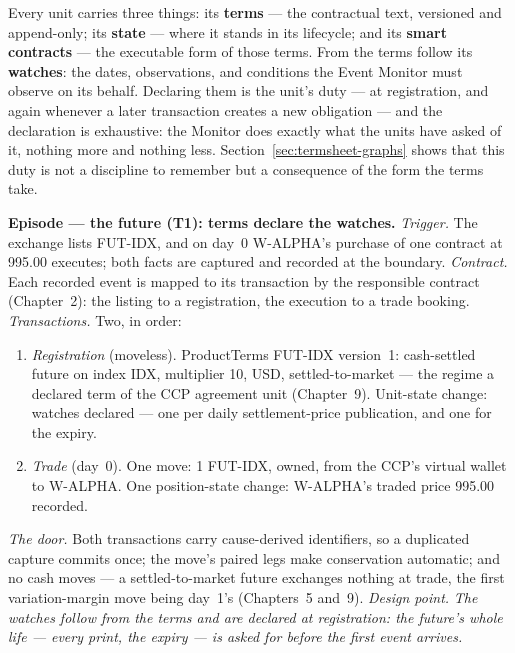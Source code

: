 Every unit carries three things: its \textbf{terms} --- the contractual text, versioned
and append-only; its \textbf{state} --- where it stands in its lifecycle; and its
\textbf{smart contracts} --- the executable form of those terms. From the terms follow
its \textbf{watches}: the dates, observations, and conditions the Event Monitor must
observe on its behalf. Declaring them is the unit's duty --- at registration, and again
whenever a later transaction creates a new obligation --- and the declaration is
exhaustive: the Monitor does exactly what the units have asked of it, nothing more and
nothing less. Section~\ref{sec:termsheet-graphs} shows that this duty is not a discipline
to remember but a consequence of the form the terms take.

\medskip\noindent\textbf{Episode --- the future (T1): terms declare the watches.}
\emph{Trigger.} The exchange lists FUT-IDX, and on day~0 W-ALPHA's purchase of one
contract at 995.00 executes; both facts are captured and recorded at the boundary.
\emph{Contract.} Each recorded event is mapped to its transaction by the responsible
contract (Chapter~2): the listing to a registration, the execution to a trade booking.
\emph{Transactions.} Two, in order:
\begin{enumerate}[nosep,leftmargin=2.2em]
\item \emph{Registration} (moveless). ProductTerms FUT-IDX version~1: cash-settled
  future on index IDX, multiplier 10, USD, settled-to-market --- the regime a declared
  term of the CCP agreement unit (Chapter~9). Unit-state change: watches declared ---
  one per daily settlement-price publication, and one for the expiry.
\item \emph{Trade} (day~0). One move: 1 FUT-IDX, owned, from the CCP's virtual wallet to
  W-ALPHA. One position-state change: W-ALPHA's traded price 995.00 recorded.
\end{enumerate}
\emph{The door.} Both transactions carry cause-derived identifiers, so a duplicated
capture commits once; the move's paired legs make conservation automatic; and no cash
moves --- a settled-to-market future exchanges nothing at trade, the first
variation-margin move being day~1's (Chapters~5 and~9).
\emph{Design point.} \emph{The watches follow from the terms and are declared at
registration: the future's whole life --- every print, the expiry --- is asked for
before the first event arrives.}

